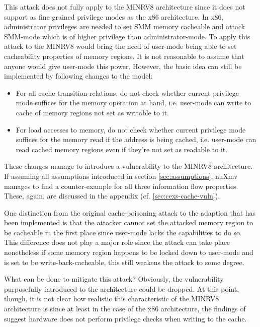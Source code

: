 This attack does not fully apply to the MINRV8 architecture since it does not support as fine grained privilege modes as the x86 architecture.
In x86, administrator privileges are needed to set SMM memory cacheable and attack SMM-mode which is of higher privilege than administrator-mode.
To apply this attack to the MINRV8 would bring the need of user-mode being able to set cacheability properties of memory regions.
It is not reasonable to assume that anyone would give user-mode this power.
However, the basic idea can still be implemented by following changes to the model:
\begin{itemize}
    \item For all cache transition relations, do not check whether current privilege mode suffices for the memory operation at hand, i.e. user-mode can write to cache of memory regions not set as writable to it.
    \item For load accesses to memory, do not check whether current privilege mode suffices for the memory read if the address is being cached, i.e. user-mode can read cached memory regions even if they're not set as readable to it.
\end{itemize}

These changes manage to introduce a vulnerability to the MINRV8 architecture.
If assuming all assumptions introduced in section \ref{sec:assumptions}, nuXmv manages to find a counter-example for all three information flow properties.
These, again, are discussed in the appendix (cf. \ref{sec:cexs-cache-vuln}).

One distinction from the original cache-poisoning attack to the adaption that has been implemented is that the attacker cannot set the attacked memory region to be cacheable in the first place since user-mode lacks the capabilities to do so.
This difference does not play a major role since the attack can take place nonetheless if some memory region happens to be locked down to user-mode and is set to be write-back-cacheable, this still weakens the attack to some degree.

What can be done to mitigate this attack?
Obviously, the vulnerability purposefully introduced to the architecture could be dropped.
At this point, though, it is not clear how realistic this characteristic of the MINRV8 architecture is since at least in the case of the x86 architecture, the findings of \cite{Wojtczuk09} suggest hardware does not perform privilege checks when writing to the cache.

